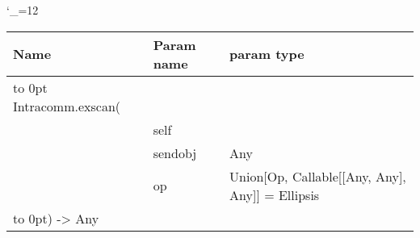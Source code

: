 \begingroup \catcode`\_=12 \tt
\begin{tabular}{lll}
\toprule
\textrm{Name}&\textrm{Param name}&\textrm{param type}\\
\midrule
\hbox to 0pt {Intracomm.exscan(\hss}\\
& self\\
& sendobj & Any\\
& op & Union[Op, Callable[[Any, Any], Any]] = Ellipsis\\
\hbox to 0pt{) -> Any\hss}\\
\bottomrule
\end{tabular}
\endgroup
